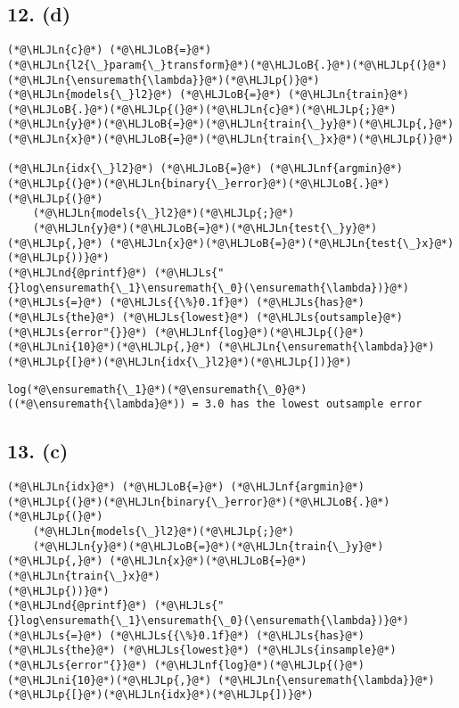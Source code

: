 \documentclass[12pt,a4paper]{article}
\newcommand{\HLJLn}[1]{#1}
\newcommand{\HLJLnd}[1]{\textcolor[RGB]{214,102,97}{#1}}
\newcommand{\HLJLnf}[1]{\textcolor[RGB]{66,102,213}{#1}}
\newcommand{\HLJLs}[1]{\textcolor[RGB]{201,61,57}{#1}}
\newcommand{\HLJLni}[1]{\textcolor[RGB]{59,151,46}{#1}}
\newcommand{\HLJLoB}[1]{\textcolor[RGB]{102,102,102}{\textbf{#1}}}
\newcommand{\HLJLp}[1]{#1}
\begin{document}
\subsection{12. (d)}

\begin{lstlisting}
(*@\HLJLn{c}@*) (*@\HLJLoB{=}@*) (*@\HLJLn{l2{\_}param{\_}transform}@*)(*@\HLJLoB{.}@*)(*@\HLJLp{(}@*)(*@\HLJLn{\ensuremath{\lambda}}@*)(*@\HLJLp{)}@*)
(*@\HLJLn{models{\_}l2}@*) (*@\HLJLoB{=}@*) (*@\HLJLn{train}@*)(*@\HLJLoB{.}@*)(*@\HLJLp{(}@*)(*@\HLJLn{c}@*)(*@\HLJLp{;}@*) (*@\HLJLn{y}@*)(*@\HLJLoB{=}@*)(*@\HLJLn{train{\_}y}@*)(*@\HLJLp{,}@*) (*@\HLJLn{x}@*)(*@\HLJLoB{=}@*)(*@\HLJLn{train{\_}x}@*)(*@\HLJLp{)}@*)

(*@\HLJLn{idx{\_}l2}@*) (*@\HLJLoB{=}@*) (*@\HLJLnf{argmin}@*)(*@\HLJLp{(}@*)(*@\HLJLn{binary{\_}error}@*)(*@\HLJLoB{.}@*)(*@\HLJLp{(}@*)
    (*@\HLJLn{models{\_}l2}@*)(*@\HLJLp{;}@*) 
    (*@\HLJLn{y}@*)(*@\HLJLoB{=}@*)(*@\HLJLn{test{\_}y}@*)(*@\HLJLp{,}@*) (*@\HLJLn{x}@*)(*@\HLJLoB{=}@*)(*@\HLJLn{test{\_}x}@*)
(*@\HLJLp{))}@*)
(*@\HLJLnd{@printf}@*) (*@\HLJLs{"{}log\ensuremath{\_1}\ensuremath{\_0}(\ensuremath{\lambda})}@*) (*@\HLJLs{=}@*) (*@\HLJLs{{\%}0.1f}@*) (*@\HLJLs{has}@*) (*@\HLJLs{the}@*) (*@\HLJLs{lowest}@*) (*@\HLJLs{outsample}@*) (*@\HLJLs{error"{}}@*) (*@\HLJLnf{log}@*)(*@\HLJLp{(}@*)(*@\HLJLni{10}@*)(*@\HLJLp{,}@*) (*@\HLJLn{\ensuremath{\lambda}}@*)(*@\HLJLp{[}@*)(*@\HLJLn{idx{\_}l2}@*)(*@\HLJLp{])}@*)
\end{lstlisting}

\begin{lstlisting}
log(*@\ensuremath{\_1}@*)(*@\ensuremath{\_0}@*)((*@\ensuremath{\lambda}@*)) = 3.0 has the lowest outsample error
\end{lstlisting}


\subsection{13. (c)}

\begin{lstlisting}
(*@\HLJLn{idx}@*) (*@\HLJLoB{=}@*) (*@\HLJLnf{argmin}@*)(*@\HLJLp{(}@*)(*@\HLJLn{binary{\_}error}@*)(*@\HLJLoB{.}@*)(*@\HLJLp{(}@*)
    (*@\HLJLn{models{\_}l2}@*)(*@\HLJLp{;}@*) 
    (*@\HLJLn{y}@*)(*@\HLJLoB{=}@*)(*@\HLJLn{train{\_}y}@*)(*@\HLJLp{,}@*) (*@\HLJLn{x}@*)(*@\HLJLoB{=}@*)(*@\HLJLn{train{\_}x}@*)
(*@\HLJLp{))}@*)
(*@\HLJLnd{@printf}@*) (*@\HLJLs{"{}log\ensuremath{\_1}\ensuremath{\_0}(\ensuremath{\lambda})}@*) (*@\HLJLs{=}@*) (*@\HLJLs{{\%}0.1f}@*) (*@\HLJLs{has}@*) (*@\HLJLs{the}@*) (*@\HLJLs{lowest}@*) (*@\HLJLs{insample}@*) (*@\HLJLs{error"{}}@*) (*@\HLJLnf{log}@*)(*@\HLJLp{(}@*)(*@\HLJLni{10}@*)(*@\HLJLp{,}@*) (*@\HLJLn{\ensuremath{\lambda}}@*)(*@\HLJLp{[}@*)(*@\HLJLn{idx}@*)(*@\HLJLp{])}@*)
\end{lstlisting}
\end{document}
